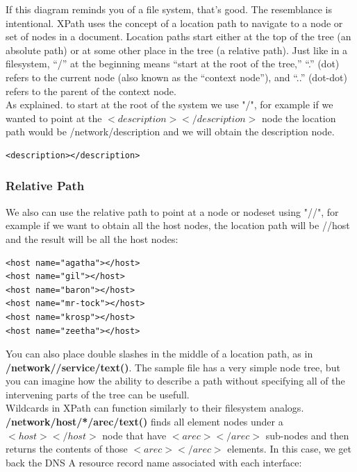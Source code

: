 If this diagram reminds you of a file system, that’s good. The resemblance is intentional. XPath uses the concept of a location path to navigate to a node or set of nodes in a document. Location paths start either at the top of the tree (an absolute path) or at some other place in the tree (a relative path). Just like in a filesystem, “/” at the beginning means “start at the root of the tree,” “.” (dot) refers to the current node (also known as the “context node”), and “..” (dot-dot) refers to the parent of the context node. \cite{Blank-Edelm} \\

As explained. to start at the root of the system we use "/", for example if we wanted to point at the $<description> </description>$ node the location path would be /network/description and we will obtain the description node.\\


\begin{lstlisting}[frame=none, title=Nodes]
<description></description>
\end{lstlisting} 


\subsubsection{Relative Path}

We also can use the relative path to point at a node or nodeset using "//", for example if we want to obtain all the host nodes, the location path will be //host and the result will be all the host nodes:\\

\begin{lstlisting}[frame=none, title=host nodes]
<host name="agatha"></host>
<host name="gil"></host>
<host name="baron"></host>
<host name="mr-tock"></host>
<host name="krosp"></host>
<host name="zeetha"></host>
\end{lstlisting}

You can also place double slashes in the middle of a location path, as in \textbf{/network//service/text()}. The sample file has a very simple node tree, but you can imagine how the ability to describe a path without specifying all of the intervening parts of the tree can be usefull.\\

Wildcards in XPath can function similarly to their filesystem analogs. \textbf{/network/host/*/arec/text()} finds all element nodes under a $<host></host>$ node that have $<arec> </arec>$ sub-nodes and then returns the contents of those $<arec></arec>$ elements. In this case, we get back the DNS A resource record name associated with each interface:\\


